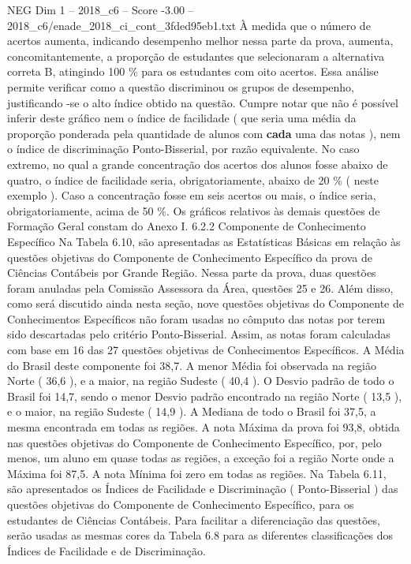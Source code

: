 \begin{textsample}{NEG Dim 1 – 2018\_c6 – Score -3.00 – 2018\_c6/enade\_2018\_ci\_cont\_3fded95eb1.txt}
À medida que o número de acertos aumenta, indicando desempenho melhor nessa parte da prova, aumenta, concomitantemente, a proporção de estudantes que selecionaram a alternativa correta B, atingindo 100 \% para os estudantes com oito acertos.
Essa análise permite verificar como a questão discriminou os grupos de desempenho, justificando -se o alto índice obtido na questão.
Cumpre notar que não é possível inferir deste gráfico nem o índice de facilidade ( que seria uma média da proporção ponderada pela quantidade de alunos com \textbf{cada} uma das notas ), nem o índice de discriminação Ponto-Bisserial, por razão equivalente.
No caso extremo, no qual a grande concentração dos acertos dos alunos fosse abaixo de quatro, o índice de facilidade seria, obrigatoriamente, abaixo de 20 \% ( neste exemplo ).
Caso a concentração fosse em seis acertos ou mais, o índice seria, obrigatoriamente, acima de 50 \%.
Os gráficos relativos às demais questões de Formação Geral constam do Anexo I. 6.2.2 Componente de Conhecimento Específico Na Tabela 6.10, são apresentadas as Estatísticas Básicas em relação às questões objetivas do Componente de Conhecimento Específico da prova de Ciências Contábeis por Grande Região.
Nessa parte da prova, duas questões foram anuladas pela Comissão Assessora da Área, questões 25 e 26.
Além disso, como será discutido ainda nesta seção, nove questões objetivas do Componente de Conhecimentos Específicos não foram usadas no cômputo das notas por terem sido descartadas pelo critério Ponto-Bisserial.
Assim, as notas foram calculadas com base em 16 das 27 questões objetivas de Conhecimentos Específicos.
A Média do Brasil deste componente foi 38,7.
A menor Média foi observada na região Norte ( 36,6 ), e a maior, na região Sudeste ( 40,4 ).
O Desvio padrão de todo o Brasil foi 14,7, sendo o menor Desvio padrão encontrado na região Norte ( 13,5 ), e o maior, na região Sudeste ( 14,9 ).
A Mediana de todo o Brasil foi 37,5, a mesma encontrada em todas as regiões.
A nota Máxima da prova foi 93,8, obtida nas questões objetivas do Componente de Conhecimento Específico, por, pelo menos, um aluno em quase todas as regiões, a exceção foi a região Norte onde a Máxima foi 87,5.
A nota Mínima foi zero em todas as regiões.
Na Tabela 6.11, são apresentados os Índices de Facilidade e Discriminação ( Ponto-Bisserial ) das questões objetivas do Componente de Conhecimento Específico, para os estudantes de Ciências Contábeis.
Para facilitar a diferenciação das questões, serão usadas as mesmas cores da Tabela 6.8 para as diferentes classificações dos Índices de Facilidade e de Discriminação.

\end{textsample}
